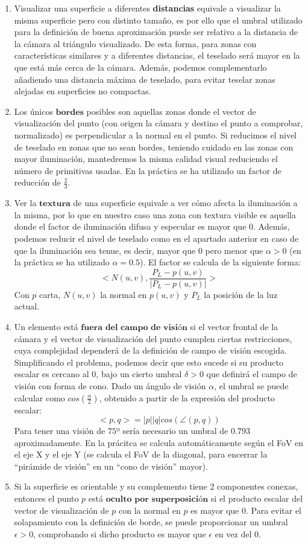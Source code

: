 	\begin{enumerate}
		\item Visualizar una superficie a diferentes \textbf{distancias} equivale a visualizar la misma superficie pero con distinto tamaño, es por ello que el umbral utilizado para la definición de buena aproximación puede ser relativo a la distancia de la cámara al triángulo visualizado. De esta forma, para zonas con características similares y a diferentes distancias, el teselado será mayor en la que está más cerca de la cámara. Además, podemos complementarlo añadiendo una distancia máxima de teselado, para evitar teselar zonas alejadas en superficies no compactas.
		\item Los únicos $\textbf{bordes}$ posibles son aquellas zonas donde el vector de visualización del punto (con origen la cámara y destino el punto a comprobar, normalizado) es perpendicular a la normal en el punto. Si reducimos el nivel de teselado en zonas que no sean bordes, teniendo cuidado en las zonas con mayor iluminación, mantedremos la misma calidad visual reduciendo el número de primitivas usadas. En la práctica se ha utilizado un factor de reducción de $\frac{2}{3}$.
		\item Ver la $\textbf{textura}$ de una superficie equivale a ver cómo afecta la iluminación a la misma, por lo que en nuestro caso una zona con textura visible es aquella donde el factor de iluminación difusa y especular es mayor que $0$. Además, podemos reducir el nivel de teselado como en el apartado anterior en caso de que la iluminación sea tenue, es decir, mayor que $0$ pero menor que $\alpha>0$ (en la práctica se ha utilizado $\alpha = 0.5$). El factor se calcula de la siguiente forma:
		$$<N(u,v),\frac{P_L-p(u,v)}{|P_L-p(u,v)|}>$$
		Con $p$ carta, $N(u,v)$ la normal en $p(u,v)$ y $P_L$ la posición de la luz actual.
		\item Un elemento está $\textbf{fuera del campo de visión}$ si el vector frontal de la cámara y el vector de visualización del punto cumplen ciertas restricciones, cuya complejidad dependerá de la definición de campo de visión escogida. Simplificando el problema, podemos decir que esto sucede si su producto escalar es cercano al $0$, bajo un cierto umbral $\delta>0$ que definirá el campo de visión con forma de cono. Dado un ángulo de visión $\alpha$, el umbral se puede calcular como $cos(\frac{\alpha}{2})$, obtenido a partir de la expresión del producto escalar:
		$$<p,q>=|p||q|cos(\angle(p,q))$$
		Para tener una visión de $75$º sería necesario un umbral de $0.793$ aproximadamente. En la prácitca se calcula automáticamente según el FoV en el eje X y el eje Y (se calcula el FoV de la diagonal, para encerrar la ``pirámide de visión'' en un ``cono de visión'' mayor).
		\item Si la superficie es orientable y su complemento tiene 2 componentes conexas, entonces el punto $p$ está $\textbf{oculto por superposición}$ si el producto escalar del vector de visualización de $p$ con la normal en $p$ es mayor que $0$. Para evitar el solapamiento con la definición de borde, se puede proporcionar un umbral $\epsilon>0$, comprobando si dicho producto es mayor que $\epsilon$ en vez del $0$.
	\end{enumerate}
	
